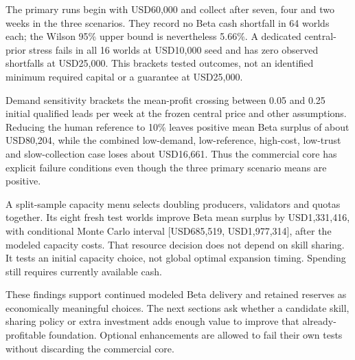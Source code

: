 The primary runs begin with USD60,000 and collect after seven, four and two weeks in the three scenarios. They record no Beta cash shortfall in 64 worlds each; the Wilson 95\% upper bound is nevertheless 5.66\%. A dedicated central-prior stress fails in all 16 worlds at USD10,000 seed and has zero observed shortfalls at USD25,000. This brackets tested outcomes, not an identified minimum required capital or a guarantee at USD25,000.

Demand sensitivity brackets the mean-profit crossing between 0.05 and 0.25 initial qualified leads per week at the frozen central price and other assumptions. Reducing the human reference to 10\% leaves positive mean Beta surplus of about USD80,204, while the combined low-demand, low-reference, high-cost, low-trust and slow-collection case loses about USD16,661. Thus the commercial core has explicit failure conditions even though the three primary scenario means are positive.

A split-sample capacity menu selects doubling producers, validators and quotas together. Its eight fresh test worlds improve Beta mean surplus by USD1,331,416, with conditional Monte Carlo interval [USD685,519, USD1,977,314], after the modeled capacity costs. That resource decision does not depend on skill sharing. It tests an initial capacity choice, not global optimal expansion timing. Spending still requires currently available cash.

These findings support continued modeled Beta delivery and retained reserves as economically meaningful choices. The next sections ask whether a candidate skill, sharing policy or extra investment adds enough value to improve that already-profitable foundation. Optional enhancements are allowed to fail their own tests without discarding the commercial core.

